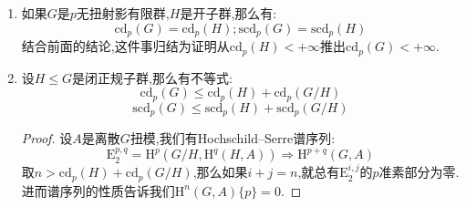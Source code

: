 \begin{enumerate}
\begin{enumerate}[(1)]
\begin{proof}
			依旧按照推论的(1)可以设$G$是射影$p$群.如果$G$是有限群,上一条导致$\mathrm{cd}_p(G)=0$或$+\infty$,矛盾.
		\end{proof}
		\item 设$\mathrm{cd}_p(G)=n$是有限的,那么$\mathrm{scd}_p(G)=n$当且仅当对$G$的任意开子群$H$都有$\mathrm{H}^{n+1}(H,\mathbb{Z})=0$.进而对$\mathrm{cd}(G)$有相同的结论.
		\begin{proof}
			
			必要性是直接的,充分性:按照Shapiro引理,对任意形如$A=\mathrm{coInd}_G^H(\mathbb{Z}^r)=\mathbb{Z}[G/H]^r$的$G$模都有$\mathrm{H}^{n+1}(G,A)=0$.设$M$是离散有限生成$G$模,那么存在正规开子群$H$在$M$上的作用平凡,于是有同构$M\cong\mathbb{Z}[G/H]^r/N$.它的长正合列结合$\mathrm{H}^{n+2}(G,N)\{p\}=0$以及$\mathrm{H}^{n+1}(G,\mathbb{Z}[G/H]^r)=0$就得到$\mathrm{H}^{n+1}(G,M)\{p\}=0$.最后对$M$取正向极限就得到对任意离散$G$模$M$都有$\mathrm{H}^{n+1}(G,M)=0$.
		\end{proof}
	\end{enumerate}
	\item 如果$G$是$p$无扭射影有限群,$H$是开子群,那么有:
	$$\mathrm{cd}_p(G)=\mathrm{cd}_p(H);\mathrm{scd}_p(G)=\mathrm{scd}_p(H)$$
	结合前面的结论,这件事归结为证明从$\mathrm{cd}_p(H)<+\infty$推出$\mathrm{cd}_p(G)<+\infty$.
	\item 设$H\le G$是闭正规子群,那么有不等式:
	$$\mathrm{cd}_p(G)\le\mathrm{cd}_p(H)+\mathrm{cd}_p(G/H)$$
	$$\mathrm{scd}_p(G)\le\mathrm{scd}_p(H)+\mathrm{scd}_p(G/H)$$
	\begin{proof}
		
		设$A$是离散$G$扭模,我们有Hochschild–Serre谱序列:
		$$\mathrm{E}_2^{p,q}=\mathrm{H}^p(G/H,\mathrm{H}^q(H,A))\Rightarrow\mathrm{H}^{p+q}(G,A)$$
		取$n>\mathrm{cd}_p(H)+\mathrm{cd}_p(G/H)$,那么如果$i+j=n$,就总有$\mathrm{E}_2^{i,j}$的$p$准素部分为零.进而谱序列的性质告诉我们$\mathrm{H}^n(G,A)\{p\}=0$.
	\end{proof}
\end{enumerate}
